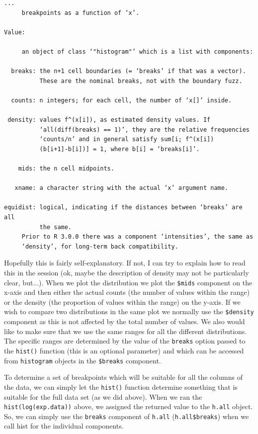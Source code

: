 \documentclass[11pt]{article}
\begin{document}
\begin{verbatim}
...
     breakpoints as a function of ‘x’.

Value:

     an object of class ‘"histogram"’ which is a list with components:

  breaks: the n+1 cell boundaries (= ‘breaks’ if that was a vector).
          These are the nominal breaks, not with the boundary fuzz.

  counts: n integers; for each cell, the number of ‘x[]’ inside.

 density: values f^(x[i]), as estimated density values. If
          ‘all(diff(breaks) == 1)’, they are the relative frequencies
          ‘counts/n’ and in general satisfy sum[i; f^(x[i])
          (b[i+1]-b[i])] = 1, where b[i] = ‘breaks[i]’.

    mids: the n cell midpoints.

   xname: a character string with the actual ‘x’ argument name.

equidist: logical, indicating if the distances between ‘breaks’ are all
          the same.
     Prior to R 3.0.0 there was a component ‘intensities’, the same as
     ‘density’, for long-term back compatibility.
\end{verbatim}

Hopefully this is fairly self-explanatory. If not, I can try to explain how
to read this in the session (ok, maybe the description of density may not
be particularly clear, but...). When we plot the distribution we plot the
\texttt{\$mids} component on the x-axis and then either the actual counts
(the number of values within the range) or the density (the proportion of
values within the range) on the y-axis. If we wish to compare two distributions
in the same plot we normally use the \texttt{\$density} component as
this is not affected by the total number of values. We also would like to
make sure that we use the same ranges for all the different distributions. The
specific ranges are determined by the value of the \texttt{breaks} option
passed to the \texttt{hist()} function (this is an optional parameter) and
which can be accessed from \texttt{histogram} objects in the \texttt{\$breaks}
component.

To determine a set of breakpoints which will be suitable for all the
columns of the data, we can simply let the \texttt{hist()} function
determine something that is suitable for the full data set (as we
did above). When we ran the \texttt{hist(log(exp.data))} above, we
assigned the returned value to the \texttt{h.all} object. So, we can
simply use the \texttt{breaks} component of \texttt{h.all} 
(\texttt{h.all\$breaks}) when we call hist for the individual components.
\end{document}
